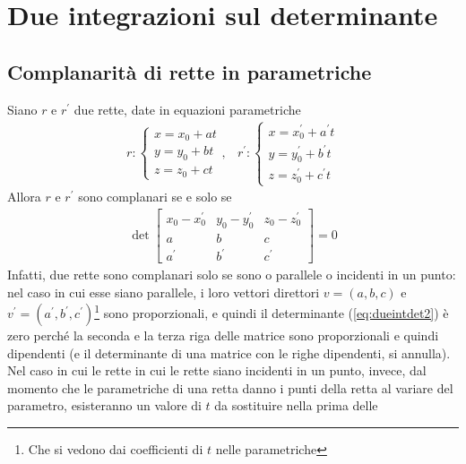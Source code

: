 \section{Due integrazioni sul determinante}
\label{sec:dueintdet}

\subsection{Complanarità di rette in parametriche}
\label{sec:comdiretteinparametriche}

Siano $r$ e $r^\prime$ due rette, date in equazioni parametriche
\begin{eqnarray}
  \label{eq:dueintdet1}
  r:
  \begin{cases}
    x=x_0+at\\
    y=y_0+bt\\
    z=z_0+ct
  \end{cases}, & r^\prime:
                 \begin{cases}
                   x=x_0^\prime+a^\prime t\\
                   y=y^\prime_0+b^\prime t\\
                   z=z_0^\prime+c^\prime t
                 \end{cases}
\end{eqnarray}
Allora $r$ e $r^\prime$ sono complanari se e solo se
\begin{eqnarray}
  \label{eq:dueintdet2}
  \det
  \begin{bmatrix}
    x_0-x_0^\prime & y_0-y_0^\prime& z_0-z_0^\prime\\
    a & b & c\\
    a^\prime & b^\prime & c^\prime
  \end{bmatrix}=0
\end{eqnarray}
Infatti, due rette sono complanari solo se sono o parallele o incidenti
in un punto: nel caso in cui esse siano parallele, i loro vettori
direttori $v=(a,b,c)$ e $v^\prime=(a^\prime, b^\prime,
c^\prime)$\footnote{Che si vedono dai coefficienti di $t$ nelle
  parametriche} sono proporzionali, e quindi il determinante
(\ref{eq:dueintdet2}) è zero perché la seconda e la terza riga delle
matrice sono proporzionali e quindi dipendenti (e il determinante di una
matrice con le righe dipendenti, si annulla). Nel caso in cui le rette in
cui le rette siano incidenti in un punto, invece, dal momento che le
parametriche di una retta danno i punti della retta al variare del
parametro, esisteranno un valore di $t$ da sostituire nella prima delle
